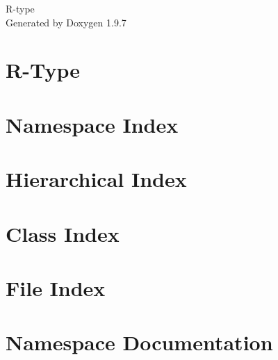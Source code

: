 \documentclass[twoside]{book}
\newcommand{\+}{\discretionary{\mbox{\scriptsize$\hookleftarrow$}}{}{}}
\newcommand{\clearemptydoublepage}{%
    \newpage{\pagestyle{empty}\cleardoublepage}%
  }
\begin{document}
  \raggedbottom
    \hypersetup{pageanchor=false,
                bookmarksnumbered=true,
                pdfencoding=unicode
               }
  \begin{titlepage}
  \vspace*{7cm}
  \begin{center}%
  {\Large R-\/type}\\
  \vspace*{1cm}
  {\large Generated by Doxygen 1.9.7}\\
  \end{center}
  \end{titlepage}
  \clearemptydoublepage
  \tableofcontents
  \clearemptydoublepage
  \hypersetup{pageanchor=true}
\chapter{R-\/\+Type}
\label{md__2home_2mbonnet_2TEK3_2B-CPP-500-REN-5-2-rtype-oceane_8krull_2README}

\chapter{Namespace Index}

\chapter{Hierarchical Index}

\chapter{Class Index}

\chapter{File Index}

\chapter{Namespace Documentation}








\end{document}
